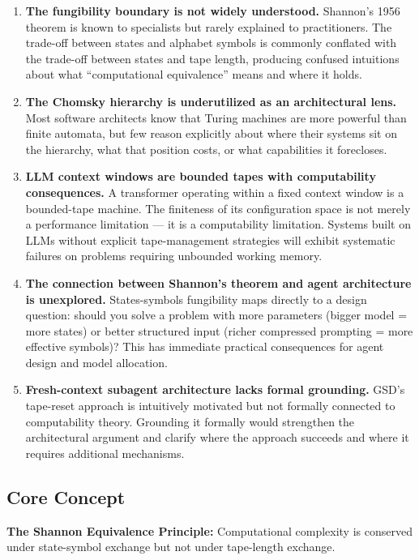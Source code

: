 \documentclass[11pt,letterpaper]{article}
\begin{document}
\begin{enumerate}
  \item \textbf{The fungibility boundary is not widely understood.} Shannon's 1956 theorem is known to specialists but rarely explained to practitioners. The trade-off between states and alphabet symbols is commonly conflated with the trade-off between states and tape length, producing confused intuitions about what ``computational equivalence'' means and where it holds.

  \item \textbf{The Chomsky hierarchy is underutilized as an architectural lens.} Most software architects know that Turing machines are more powerful than finite automata, but few reason explicitly about where their systems sit on the hierarchy, what that position costs, or what capabilities it forecloses.

  \item \textbf{LLM context windows are bounded tapes with computability consequences.} A transformer operating within a fixed context window is a bounded-tape machine. The finiteness of its configuration space is not merely a performance limitation --- it is a computability limitation. Systems built on LLMs without explicit tape-management strategies will exhibit systematic failures on problems requiring unbounded working memory.

  \item \textbf{The connection between Shannon's theorem and agent architecture is unexplored.} States-symbols fungibility maps directly to a design question: should you solve a problem with more parameters (bigger model = more states) or better structured input (richer compressed prompting = more effective symbols)? This has immediate practical consequences for agent design and model allocation.

  \item \textbf{Fresh-context subagent architecture lacks formal grounding.} GSD's tape-reset approach is intuitively motivated but not formally connected to computability theory. Grounding it formally would strengthen the architectural argument and clarify where the approach succeeds and where it requires additional mechanisms.
\end{enumerate}

\subsection{Core Concept}

\textbf{The Shannon Equivalence Principle:} Computational complexity is conserved under state-symbol exchange but not under tape-length exchange.
\end{document}
